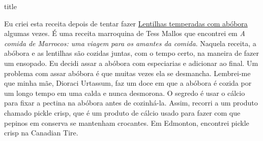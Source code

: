 \documentclass [11pt, papel de carta] {article}
\begin{document}
 {title}

Eu criei esta receita depois de tentar fazer \href {SpicedLentilsWithPumpkin.html} {Lentilhas temperadas com abóbora} algumas vezes. É uma receita marroquina de Tess Mallos que encontrei em {\it A comida de Marrocos: uma viagem para os amantes da comida}. Naquela receita, a abóbora e as lentilhas são cozidas juntas, com o tempo certo, na maneira de fazer um ensopado. Eu decidi assar a abóbora com especiarias e adicionar ao final. Um problema com assar abóbora é que muitas vezes ela se desmancha. Lembrei-me que minha mãe, Dioraci Urtassum, faz um doce em que a abóbora é cozida por um longo tempo em uma calda e nunca desmorona. O segredo é usar o cálcio para fixar a pectina na abóbora antes de cozinhá-la. Assim, recorri a um produto chamado pickle crisp, que é um produto de cálcio usado para fazer com que pepinos em conserva se mantenham crocantes. Em Edmonton, encontrei pickle crisp na Canadian Tire.
\end{document}
